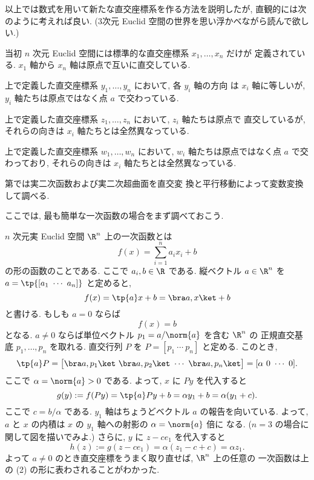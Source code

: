 \documentclass[12pt,twoside]{jarticle}
\begin{document}
以上では数式を用いて新たな直交座標系を作る方法を説明したが, 
直観的には次のように考えれば良い.  
(3次元 Euclid 空間の世界を思い浮かべながら読んで欲しい.)

当初 $n$ 次元 Euclid 空間には標準的な直交座標系 $x_1,\dots,x_n$ だけが
定義されている.  $x_1$ 軸から $x_n$ 軸は原点で互いに直交している.

上で定義した直交座標系 $y_1,\dots,y_n$ において, 各 $y_i$ 軸の方向
は $x_i$ 軸に等しいが, $y_i$ 軸たちは原点ではなく点 $a$ で交わっている.

上で定義した直交座標系 $z_1,\dots,z_n$ において, $z_i$ 軸たちは原点で
直交しているが, それらの向きは $x_i$ 軸たちとは全然異なっている.

上で定義した直交座標系 $w_1,\dots,w_n$ において, 
$w_i$ 軸たちは原点ではなく点 $a$ で交わっており, 
それらの向きは $x_i$ 軸たちとは全然異なっている.

第では実二次函数および実二次超曲面を直交変
換と平行移動によって変数変換して調べる.

ここでは, 最も簡単な一次函数の場合をまず調べておこう. 

$n$ 次元実 Euclid 空間 $\R^n$ 上の一次函数とは
\begin{equation*}
  f(x) = \sum_{i=1}^n a_i x_i + b
\end{equation*}
の形の函数のことである.  ここで $a_i,b\in\R$ である. 
縦ベクトル $a\in\R^n$ を $a=\tp{[a_1\ \cdots\ a_n]}$ と定めると,
\begin{equation*}
  f(x) = \tp{a}x + b = \bra a,x\ket + b 
\end{equation*}
と書ける. もしも $a=0$ ならば
\begin{equation*}
  f(x) = b
  \tag{1}
\end{equation*}
となる. $a\ne 0$ ならば単位ベクトル $p_1=a/\norm{a}$ を含む $\R^n$ の
正規直交基底 $p_1,\dots,p_n$ を取れる.  
直交行列 $P$ を $P=[p_1\ \cdots\ p_n]$ と定める.  このとき, 
\begin{equation*}
  \tp{a}P 
  = \bigl[\bra a,p_1\ket\ \bra a,p_2\ket\ \cdots\ \bra a,p_n\ket\bigr] 
  = [\alpha\ 0\ \cdots\ 0].
\end{equation*}
ここで $\alpha=\norm{a}>0$ である. 
よって, $x$ に $Py$ を代入すると
\begin{equation*}
  g(y) := f(Py) = \tp{a}Py + b = \alpha y_1 + b = \alpha(y_1 + c).
\end{equation*}
ここで $c = b/\alpha$ である.
$y_1$ 軸はちょうどベクトル $a$ の報告を向いている.
よって, $a$ と $x$ の内積は $x$ の $y_1$ 軸への射影の $\alpha=\norm{a}$ 倍に
なる.  ($n=3$ の場合に関して図を描いでみよ.)
さらに, $y$ に $z - c e_1$ を代入すると
\begin{equation*}
  h(z) := g(z - c e_1) = \alpha(z_1 - c + c) = \alpha z_1.
  \tag{2}
\end{equation*}
よって $a\ne 0$ のとき直交座標をうまく取り直せば, $\R^n$ 上の任意の
一次函数は上の (2) の形に表わされることがわかった.
\end{document}
